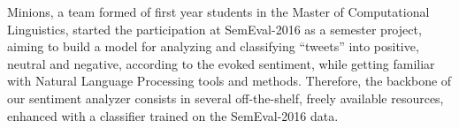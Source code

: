 Minions, a team formed of first year students in the Master of Computational Linguistics, started the participation at SemEval-2016 as a semester project, aiming to build a model for analyzing and classifying ``tweets'' into positive, neutral and negative, according to the evoked sentiment, while getting familiar with Natural Language Processing tools and methods. Therefore, the backbone of our sentiment analyzer consists in several off-the-shelf, freely available resources, enhanced with a classifier trained on the SemEval-2016 data.
